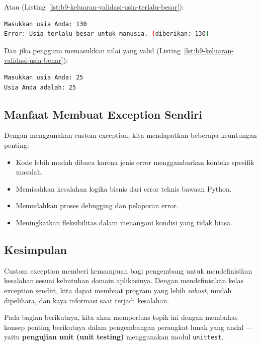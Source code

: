 Atau (Listing~\ref{lst:b9-keluaran-validasi-usia-terlalu-besar}):

\begin{lstlisting}[language=bash, caption={Keluaran validasi untuk usia terlalu besar}, label={lst:b9-keluaran-validasi-usia-terlalu-besar}]
Masukkan usia Anda: 130
Error: Usia terlalu besar untuk manusia. (diberikan: 130)
\end{lstlisting}

Dan jika pengguna memasukkan nilai yang valid (Listing~\ref{lst:b9-keluaran-validasi-usia-benar}):

\begin{lstlisting}[language=bash, caption={Keluaran validasi untuk usia yang benar}, label={lst:b9-keluaran-validasi-usia-benar}]
Masukkan usia Anda: 25
Usia Anda adalah: 25
\end{lstlisting}

\subsection*{Manfaat Membuat Exception Sendiri}

Dengan menggunakan custom exception, kita mendapatkan beberapa keuntungan penting:
\begin{itemize}
    \item Kode lebih mudah dibaca karena jenis error menggambarkan konteks spesifik masalah.
    \item Memisahkan kesalahan logika bisnis dari error teknis bawaan Python.
    \item Memudahkan proses debugging dan pelaporan error.
    \item Meningkatkan fleksibilitas dalam menangani kondisi yang tidak biasa.
\end{itemize}

\subsection*{Kesimpulan}

Custom exception memberi kemampuan bagi pengembang untuk mendefinisikan kesalahan sesuai kebutuhan domain aplikasinya.  
Dengan mendefinisikan kelas exception sendiri, kita dapat membuat program yang lebih \textit{robust}, mudah dipelihara, dan kaya informasi saat terjadi kesalahan.

Pada bagian berikutnya, kita akan memperluas topik ini dengan membahas konsep penting berikutnya dalam pengembangan perangkat lunak yang andal — yaitu \textbf{pengujian unit (unit testing)} menggunakan modul \texttt{unittest}.



